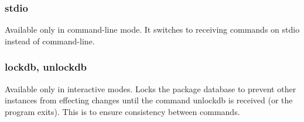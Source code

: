 \subsubsection{stdio}
Available only in command-line mode. It switches to receiving commands on stdio instead of command-line.
\subsubsection{lockdb, unlockdb}
Available only in interactive modes. Locks the package database to prevent other instances from effecting changes until the command unlockdb is received (or the program exits). This is to ensure consistency between commands.